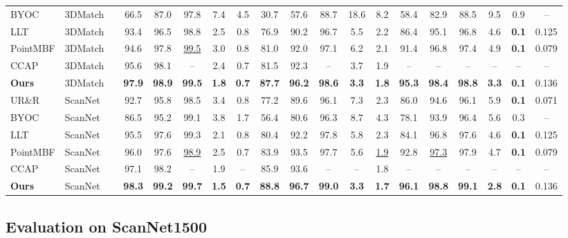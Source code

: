 \documentclass[11pt,a4paper]{article}
\begin{document}
\begin{table}[h]
{\begin{tabular}{llc ccc cc ccc cc ccc cc c}
BYOC        & 3DMatch   &   & 66.5 & 87.0 & 97.8 & 7.4  & 4.5  & 30.7 & 57.6 & 88.7 & 18.6 & 8.2  & 58.4 & 82.9 & 88.5 & 9.5  & 0.9 & -- \\
LLT         & 3DMatch   &   & 93.4 & 96.5 & 98.8 & 2.5  & 0.8  & 76.9 & 90.2 & 96.7 & 5.5  & 2.2  & 86.4 & 95.1 & 96.8 & 4.6  & \textbf{0.1} & 0.125 \\
PointMBF    & 3DMatch   &   & 94.6 & 97.8 & \underline{99.5} & 3.0  & 0.8  & 81.0 & 92.0 & 97.1 & 6.2  & 2.1  & 91.4 & 96.8 & 97.4 & 4.9  & \textbf{0.1} & 0.079 \\
CCAP        & 3DMatch   &   & 95.6 & 98.1 & --   & 2.4  & 0.7  & 81.5 & 92.3 & --   & 3.7  & 1.9  & --   & --   & --   & --   & --  & -- \\
\textbf{Ours} & 3DMatch &   & \textbf{97.9} & \textbf{98.9} & \textbf{99.5} & \textbf{1.8} & \textbf{0.7} & \textbf{87.7} & \textbf{96.2} & \textbf{98.6} & \textbf{3.3} & \textbf{1.8} & \textbf{95.3} & \textbf{98.4} & \textbf{98.8} & \textbf{3.3} & \textbf{0.1} & 0.136 \\
\midrule
UR\&R       & ScanNet   &   & 92.7 & 95.8 & 98.5 & 3.4  & 0.8  & 77.2 & 89.6 & 96.1 & 7.3  & 2.3  & 86.0 & 94.6 & 96.1 & 5.9  & \textbf{0.1} & 0.071 \\
BYOC        & ScanNet   &   & 86.5 & 95.2 & 99.1 & 3.8  & 1.7  & 56.4 & 80.6 & 96.3 & 8.7  & 4.3  & 78.1 & 93.9 & 96.4 & 5.6  & 0.3 & -- \\
LLT         & ScanNet   &   & 95.5 & 97.6 & 99.3 & 2.1  & 0.8  & 80.4 & 92.2 & 97.8 & 5.8  & 2.3  & 84.1 & 96.8 & 97.6 & 4.6  & \textbf{0.1} & 0.125 \\
PointMBF    & ScanNet   &   & 96.0 & 97.6 & \underline{98.9} & 2.5  & 0.7  & 83.9 & 93.5 & 97.7 & 5.6  & \underline{1.9} & 92.8 & \underline{97.3} & 97.9 & 4.7  & \textbf{0.1} & 0.079 \\
CCAP        & ScanNet   &   & 97.1 & 98.2 & --   & 1.9  & --   & 85.9 & 93.6 & --   & --   & 1.8  & --   & --   & --   & --   & --  & -- \\
\textbf{Ours} & ScanNet &   & \textbf{98.3} & \textbf{99.2} & \textbf{99.7} & \textbf{1.5} & \textbf{0.7} & \textbf{88.8} & \textbf{96.7} & \textbf{99.0} & \textbf{3.3} & \textbf{1.7} & \textbf{96.1} & \textbf{98.8} & \textbf{99.1} & \textbf{2.8} & \textbf{0.1} & 0.136 \\
\bottomrule
\end{tabular}
}
\end{table}

\subsection{Evaluation on ScanNet1500}
\end{document}
